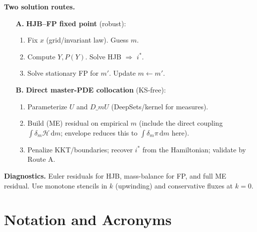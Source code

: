 ﻿\documentclass[11pt,letterpaper,oneside]{article}
\numberwithin{equation}{section}
\newcommand{\1}{\mathbf{1}}
\newcommand{\dmU}{D\_m U}
\begin{document}
\begin{tcolorbox}[didacticstyle]
\textbf{Two solution routes.}
\begin{enumerate}[leftmargin=1.25em]
\item[\textbf{A.}] \textbf{HJB--FP fixed point} (robust):
\begin{enumerate}[leftmargin=1em,label*=\arabic*.]
\item Fix $x$ (grid/invariant law). Guess $m$.
\item Compute $Y,P(Y)$. Solve HJB $\Rightarrow$ $i^*$.
\item Solve stationary FP for $m'$. Update $m\leftarrow m'$.
\end{enumerate}
\item[\textbf{B.}] \textbf{Direct master-PDE collocation} (KS-free):
\begin{enumerate}[leftmargin=1em,label*=\arabic*.]
\item Parameterize $U$ and $\dmU$ (DeepSets/kernel for measures).
\item Build (ME) residual on empirical $m$ (include the direct coupling $\int \delta_m \mathcal H\,\mathrm dm$; envelope reduces this to $\int \delta_m \pi\,\mathrm dm$ here).
\item Penalize KKT/boundaries; recover $i^*$ from the Hamiltonian; validate by Route A.
\end{enumerate}
\end{enumerate}

\textbf{Diagnostics.} Euler residuals for HJB, mass-balance for FP, and full ME residual. Use monotone stencils in $k$ (upwinding) and conservative fluxes at $k=0$.
\end{tcolorbox}



\clearpage
\newpage
\section{Notation and Acronyms}\label{sec:notation}
\end{document}
